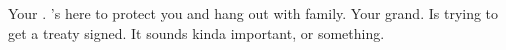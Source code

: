 \documentclass[char]{NeptuneBall}
\begin{document}
%
%
%
%

\begin{contacts}
  \contact{\cAriel{}} Your \cAriel{\parent}. \cAriel{\They}'s here to protect you and hang out with \cAriel{\their} family.
	\contact{\cKing{}} Your grand\cKing{\parent}. Is trying to get a treaty signed. It sounds kinda important, or something.
\end{contacts}
\end{document}
